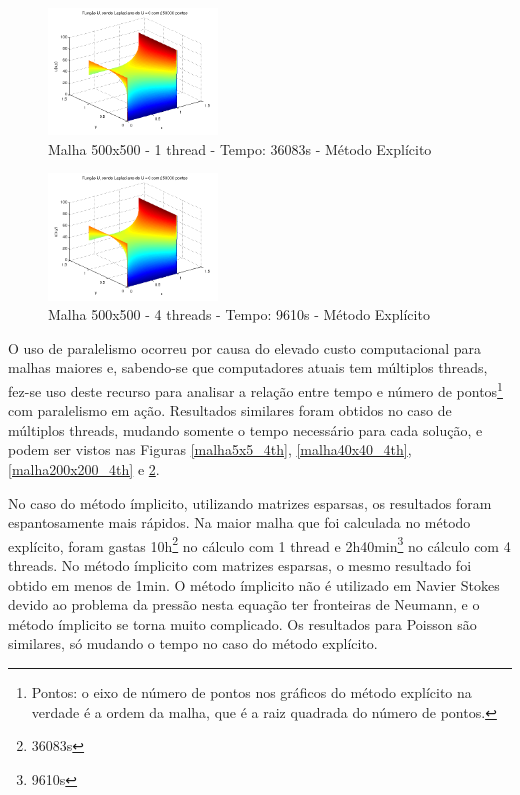\documentclass[journal]{IEEEtran}
\begin{document}
\begin{figure}[ht!]

\centering
\includegraphics[width = 0.4\textwidth]{figures/problema01_m1/06.png}
\caption{Malha 500x500 - 1 thread - Tempo: 36083s - Método Explícito\label{malha500x500_1th}}
\end{figure}

\begin{figure}[ht!]

\centering
\includegraphics[width = 0.4\textwidth]{figures/problema01_m1/15.png}
\caption{Malha 500x500 - 4 threads - Tempo: 9610s - Método Explícito\label{malha500x500_4th}}
\end{figure}

O uso de paralelismo ocorreu por causa do elevado custo computacional para malhas maiores e, sabendo-se que computadores atuais tem múltiplos threads, fez-se uso deste recurso para analisar a relação entre tempo e número de pontos\footnote{Pontos: o eixo de número de pontos nos gráficos do método explícito na verdade é a ordem da malha, que é a raiz quadrada do número de pontos.} com paralelismo em ação. Resultados similares foram obtidos no caso de múltiplos threads, mudando somente o tempo necessário para cada solução, e podem ser vistos nas Figuras \ref{malha5x5_4th}, \ref{malha40x40_4th}, \ref{malha200x200_4th} e \ref{malha500x500_4th}.

No caso do método ímplicito, utilizando matrizes esparsas, os resultados foram espantosamente mais rápidos. Na maior malha que foi calculada no método explícito, foram gastas 10h\footnote{36083s} no cálculo com 1 thread e 2h40min\footnote{9610s} no cálculo com 4 threads. No método ímplicito com matrizes esparsas, o mesmo resultado foi obtido em menos de 1min. O método ímplicito não é utilizado em Navier Stokes devido ao problema da pressão nesta equação ter fronteiras de Neumann, e o método ímplicito se torna muito complicado. Os resultados para Poisson são similares, só mudando o tempo no caso do método explícito.
\end{document}

